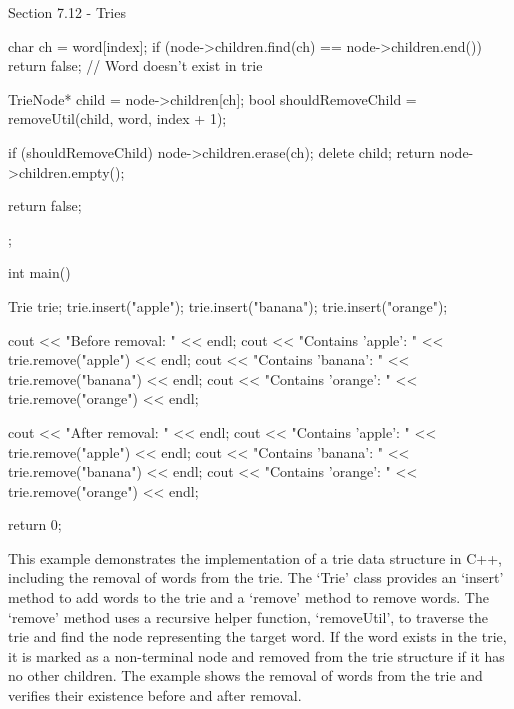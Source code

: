 \begin{notes}{Section 7.12 - Tries}
\begin{highlight}
\begin{code}[C++]
{{            char ch = word[index];
            if (node->children.find(ch) == node->children.end()) {
                return false; // Word doesn't exist in trie
            }
    
            TrieNode* child = node->children[ch];
            bool shouldRemoveChild = removeUtil(child, word, index + 1);
    
            if (shouldRemoveChild) {
                node->children.erase(ch);
                delete child;
                return node->children.empty();
            }
    
            return false;
        }
    };
    
    int main() {
        Trie trie;
        trie.insert("apple");
        trie.insert("banana");
        trie.insert("orange");
    
        cout << "Before removal: " << endl;
        cout << "Contains 'apple': " << trie.remove("apple") << endl;
        cout << "Contains 'banana': " << trie.remove("banana") << endl;
        cout << "Contains 'orange': " << trie.remove("orange") << endl;
    
        cout << "After removal: " << endl;
        cout << "Contains 'apple': " << trie.remove("apple") << endl;
        cout << "Contains 'banana': " << trie.remove("banana") << endl;
        cout << "Contains 'orange': " << trie.remove("orange") << endl;
    
        return 0;
    }
    \end{code}
        This example demonstrates the implementation of a trie data structure in C++, including the removal of words from the trie. The `Trie' class provides an `insert' method to add words to the trie and a `remove' method to remove words. The `remove' method uses a recursive helper function, `removeUtil', to traverse the trie and find the node 
        representing the target word. If the word exists in the trie, it is marked as a non-terminal node and removed from the trie structure if it has no other children. The example shows the removal of words from the trie and verifies their existence before and after removal.
    \end{highlight}
\end{notes}
